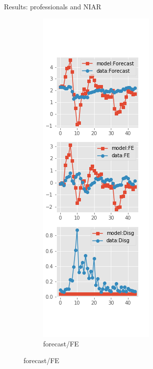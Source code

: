 \documentclass{beamer}
\begin{document}
\begin{frame}{Results: professionals and NIAR}
\begin{figure}[ht]
\begin{subfigure}[b]{0.19\textwidth}
		\end{subfigure}
		\hfill
		\begin{subfigure}[b]{0.19\textwidth}
			\caption{forecast/FE}
			\includegraphics[width=\textwidth, height = 0.8\textheight]{figuresDraft/spf_ni_est_diag2.png}

\end{subfigure}
\end{figure}
\end{frame}
\end{document}
